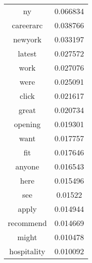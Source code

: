 \documentclass[12pt]{amsart}
\newcommand{\0}{\mat{0}}
\newcommand{\1}{\mathds{1}}
\begin{document}
\begin{table}[!h]
\begin{minipage}{.5\linewidth}
{\begin{tabular}{|c|c|}
                ny & 0.066834  \\
                careerarc & 0.038766  \\
                newyork & 0.033197  \\
                latest & 0.027572  \\
                work & 0.027076  \\
                were & 0.025091  \\
                click & 0.021617  \\
                great & 0.020734  \\
                opening & 0.019301  \\
                want & 0.017757  \\
                fit & 0.017646  \\
                anyone & 0.016543  \\
                here & 0.015496  \\
                see & 0.01522  \\
                apply & 0.014944  \\
                recommend & 0.014669  \\
                might & 0.010478  \\
                hospitality & 0.010092 \\ 
                \hline
        	\end{tabular}
        }
    \end{minipage} 
\end{table}
\end{document}
